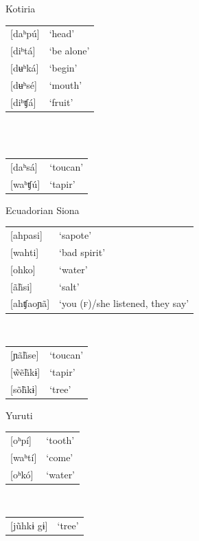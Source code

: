\documentclass[output=paper]{langscibook}
\begin{document}
\begin{exe}
\ex\label{exe-dia-KT-ES-YU}
\begin{xlist}
\ex Kotiria
\ea \citep[24--25]{Stenzel:2013}\smallskip\\
\begin{tabular}{@{}ll}
{[}daʰpú]		&`head'		\\
{[}diʰt\'a]			&`be alone'	\\
{[}dʉʰk\'a]	&`begin'		\\
{[}dʉʰs\'e]	&`mouth'		\\
{[}diʰʧ\'a]		&`fruit'		\\
\end{tabular}\\
\ex \citep[355--356]{Stenzel:2007}\smallskip\\
\begin{tabular}{@{}ll}
{[}daʰs\'a]  &`toucan'   \\
{[}waʰʧú]    &   `tapir' \\
\end{tabular}
\z
\newpage
\ex Ecuadorian Siona
\ea \citep[102]{Bruil:2014}\smallskip\\
\begin{tabular}{@{}ll}
{[}ahpasi]			&	`sapote'			\\
{[}wahti]			&	`bad spirit'			\\
{[}ohko]			&	`water'			\\
{[}ãh̃si]			&	 `salt'			\\
{[}ahʧaoɲã]	&	`you (\textsc{f})/she listened, they say'	\\
\end{tabular}
\ex \citep{Bruil:2012}\smallskip\\
\begin{tabular}{@{}ll}
{[}ɲãh̃se]     &   `toucan'    \\
{[}w̃ẽh̃kɨ]     &   `tapir'  \\
{[}sõh̃kɨ]   &   `tree'  \\
\end{tabular}
\z
\ex Yuruti
\ea \citep[28]{Stenzel:2013}\smallskip\\
\begin{tabular}{@{}ll}
{[}oʰp\'i]		&	`tooth'	\\
{[}waʰt\'i]	&	`come'	\\
{[}oʰk\'o]		&	`water'	\\
\end{tabular}
\ex \citep[471]{KinchKinch:2000}\\
\begin{tabular}{@{}ll}
{[}jũhkɨ gɨ]  &   `tree'  \\
\end{tabular}
\z
\end{xlist}


\end{exe}
\end{document}
